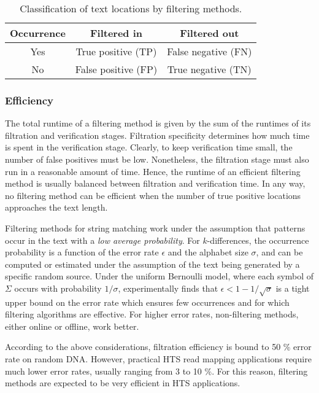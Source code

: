 \begin{table}[b]
\begin{center}
\caption[Classification of text locations by filtering methods]{Classification of text locations by filtering methods.}
\begin{tabular}{ccc}
\toprule
Occurrence & Filtered in & Filtered out\\
\midrule
Yes & True positive (TP) & False negative (FN) \\
No & False positive (FP) & True negative (TN) \\
\bottomrule
\end{tabular}
\label{tab:filter:accuracy}
\end{center}
\end{table}

\subsubsection{Efficiency}

The total runtime of a filtering method is given by the sum of the runtimes of its filtration and verification stages.
Filtration specificity determines how much time is spent in the verification stage.
Clearly, to keep verification time small, the number of false positives must be low.
Nonetheless, the filtration stage must also run in a reasonable amount of time.
Hence, the runtime of an efficient filtering method is usually balanced between filtration and verification time.
In any way, no filtering method can be efficient when the number of true positive locations approaches the text length.

Filtering methods for string matching work under the assumption that patterns occur in the text with a \emph{low average probability}.
For $k$-differences, the occurrence probability is a function of the error rate $\epsilon$ and the alphabet size $\sigma$, and can be computed or estimated under the assumption of the text being generated by a specific random source.
Under the uniform Bernoulli model, where each symbol of $\Sigma$ occurs with probability $1/\sigma$, \cite{Navarro2001a} experimentally finds that $\epsilon < 1 - 1 / \sqrt{\sigma}$ is a tight upper bound on the error rate which ensures few occurrences and for which filtering algorithms are effective.
For higher error rates, non-filtering methods, either online or offline, work better.

According to the above considerations, filtration efficiency is bound to 50 \% error rate on random DNA.
However, practical HTS read mapping applications require much lower error rates, usually ranging from 3 to 10 \%.
For this reason, filtering methods are expected to be very efficient in HTS applications.

